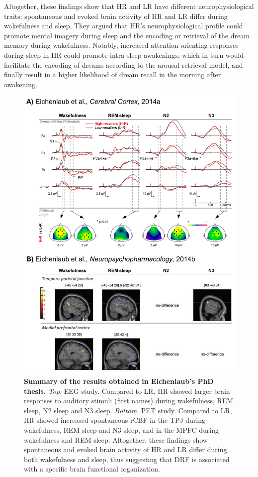 Altogether, these findings show that HR and LR have different neurophysiological traits: spontaneous and evoked brain activity of HR and LR differ during wakefulness and sleep. They argued that HR’s neurophysiological profile could promote mental imagery during sleep and the encoding or retrieval of the dream memory during wakefulness. Notably, increased attention-orienting responses during sleep in HR could promote intra-sleep awakenings, which in turn would facilitate the encoding of dreams according to the arousal-retrieval model, and finally result in a higher likelihood of dream recall in the morning after awakening.

\begin{figure}[!htb]
	\includegraphics[width=\textwidth]{Fig/Intro/Intro_JBE_summary/Intro_JBE_summary.png}
	\caption[Summary of the results obtained in Eichenlaub's PhD thesis]{\textbf{Summary of the results obtained in Eichenlaub's PhD thesis.} \emph{Top}. EEG study. Compared to LR, HR showed larger brain responses to auditory stimuli (first names) during wakefulness, REM sleep, N2 sleep and N3 sleep. \emph{Bottom}. PET study. Compared to LR, HR showed increased spontaneous rCBF in the TPJ during wakefulness, REM sleep and N3 sleep, and in the MPFC during wakefulness and REM sleep. Altogether, these findings show spontaneous and evoked brain activity of HR and LR differ during both wakefulness and sleep, thus suggesting that DRF is associated with a specific brain functional organization.}
	\label{fig:intro:jbe-summary}
\end{figure}

